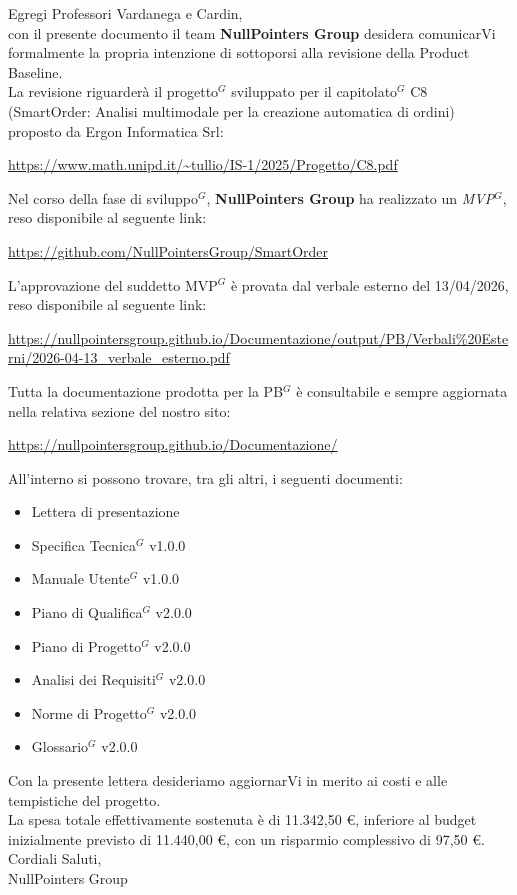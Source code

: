 \documentclass{article}
\begin{document}
    Egregi Professori Vardanega e Cardin,\\
    con il presente documento il team \textbf{NullPointers Group} desidera comunicarVi formalmente la propria intenzione di sottoporsi alla revisione della Product Baseline.\\
	La revisione riguarderà il progetto$^G$ sviluppato per il capitolato$^G$ C8 (SmartOrder: Analisi multimodale per la creazione automatica di ordini) proposto da Ergon Informatica Srl:
    
    \begin{center}
        \url{https://www.math.unipd.it/~tullio/IS-1/2025/Progetto/C8.pdf}
    \end{center}

    Nel corso della fase di sviluppo$^G$, \textbf{NullPointers Group} ha realizzato un \textit{MVP$^G$}, reso disponibile al seguente link:
    
    \begin{center}
        \url{https://github.com/NullPointersGroup/SmartOrder}
    \end{center}
    
    L'approvazione del suddetto MVP$^G$ è provata dal verbale esterno del 13/04/2026, reso disponibile al seguente link:
    
    \begin{center}
    	\url{https://nullpointersgroup.github.io/Documentazione/output/PB/Verbali%20Esterni/2026-04-13_verbale_esterno.pdf}
    \end{center}

    Tutta la documentazione prodotta per la PB$^G$ è consultabile e sempre aggiornata nella relativa sezione del nostro sito: 
    \begin{center}
        \url{https://nullpointersgroup.github.io/Documentazione/}
    \end{center}

    All'interno si possono trovare, tra gli altri, i seguenti documenti:
    \begin{itemize}
        \item Lettera di presentazione
        \item Specifica Tecnica$^G$ v1.0.0
        \item Manuale Utente$^G$ v1.0.0
        \item Piano di Qualifica$^G$ v2.0.0
        \item Piano di Progetto$^G$ v2.0.0
        \item Analisi dei Requisiti$^G$ v2.0.0
        \item Norme di Progetto$^G$ v2.0.0
        \item Glossario$^G$ v2.0.0
    \end{itemize}

    Con la presente lettera desideriamo aggiornarVi in merito ai costi e alle tempistiche del progetto. \\
	La spesa totale effettivamente sostenuta è di 11.342,50 €, inferiore al budget inizialmente previsto di 11.440,00 €, con un risparmio complessivo di 97,50 €.\\[0.3cm]

    Cordiali Saluti,\\[0.3cm]
    NullPointers Group
    
\end{document}

